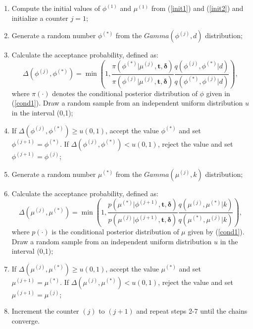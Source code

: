 \documentclass[]{interact}
\theoremstyle{plain}%
\theoremstyle{definition}
\theoremstyle{remark}
\begin{document}
\begin{enumerate}
\item Compute the initial values of $\phi^{(1)}$ and $\mu^{(1)}$ from (\ref{init1}) and (\ref{init2}) and initialize a counter $j=1$;
\item Generate a random number $\phi^{(*)}$ from the $Gamma(\phi^{(j)}, d)$ distribution;
\item Calculate the acceptance probability, defined as:
\begin{equation*}
\Delta\left(\phi^{(j)},\phi^{(*)}\right)=\min\left(1, \frac{\pi\left(\phi^{(*)}|\mu^{(j)},\boldsymbol{t,\delta}\right)}{\pi\left(\phi^{(j)}|\mu^{(j)},\boldsymbol{t,\delta}\right)} \frac{q\left(\phi^{(j)},\phi^{(*)}|d\right)}{q\left(\phi^{(*)},\phi^{(j)}|d\right)}\right),
\end{equation*}
where $\pi(\cdot)$ denotes the conditional posterior distribution of $\phi$ given in (\ref{cond1}). Draw a random sample from an independent uniform distribution $u$ in the interval (0,1);
\item If $\Delta\left(\phi^{(j)},\phi^{(*)}\right)\geq u(0,1)$, accept the value $\phi^{(*)}$ and set $\phi^{(j+1)}=\phi^{(*)}$. If $\Delta\left(\phi^{(j)},\phi^{(*)}\right)< u(0,1)$, reject the value and set $\phi^{(j+1)}=\phi^{(j)}$;

\item Generate a random number $\mu^{(*)}$ from the $Gamma(\mu^{(j)}, k)$ distribution;
\item Calculate the acceptance probability, defined as:
\begin{equation*}
\Delta\left(\mu^{(j)},\mu^{(*)}\right)=\min\left(1, \frac{p\left(\mu^{(*)}|\phi^{(j+1)},\boldsymbol{t,\delta}\right)}{p\left(\mu^{(j)}|\phi^{(j+1)},\boldsymbol{t,\delta}\right)} \frac{q\left(\mu^{(j)},\mu^{(*)}|k\right)}{q\left(\mu^{(*)},\mu^{(j)}|k\right)}\right),
\end{equation*}
where $p(\cdot)$ is the conditional posterior distribution of $\mu$ given by (\ref{cond1}). Draw a random sample from an independent uniform distribution $u$ in the interval (0,1);
\item If $\Delta\left(\mu^{(j)},\mu^{(*)}\right)\geq u(0,1)$, accept the value $\mu^{(*)}$ and set $\mu^{(j+1)}=\mu^{(*)}$. If $\Delta\left(\mu^{(j)},\mu^{(*)}\right)< u(0,1)$, reject the value and set $\mu^{(j+1)}=\mu^{(j)}$;

\item Increment the counter $(j)$ to $(j+1)$ and repeat steps 2-7 until the chains converge.
\end{enumerate}
\end{document}
